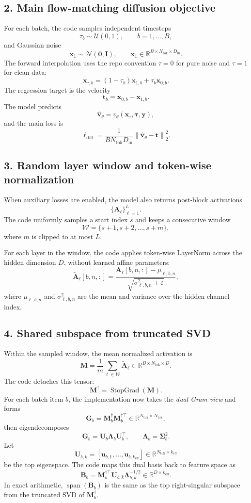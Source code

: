 \documentclass[11pt]{article}
\newcommand{\StopGrad}{\operatorname{StopGrad}}
\begin{document}
\subsection*{2. Main flow-matching diffusion objective}
For each batch, the code samples independent timesteps
\[
  \tau_b \sim \mathcal{U}(0,1),
  \qquad b=1,\dots,B,
\]
and Gaussian noise
\[
  \bm{x}_1 \sim \mathcal{N}(\bm{0}, \bm{I}),
  \qquad
  \bm{x}_1 \in \mathbb{R}^{B\times N_{\mathrm{tok}}\times D_{\mathrm{in}}}.
\]
The forward interpolation uses the repo convention $\tau=0$ for pure noise and $\tau=1$ for clean data:
\[
  \bm{x}_{\tau,b} = (1-\tau_b)\bm{x}_{1,b} + \tau_b \bm{x}_{0,b}.
\]
The regression target is the velocity
\[
  \bm{t}_b = \bm{x}_{0,b} - \bm{x}_{1,b}.
\]
The model predicts
\[
  \hat{\bm{v}}_\theta = v_\theta(\bm{x}_\tau,\bm{\tau},\bm{y}),
\]
and the main loss is
\[
  \ell_{\mathrm{diff}}
  =
  \frac{1}{B N_{\mathrm{tok}} D_{\mathrm{in}}}
  \left\|
    \hat{\bm{v}}_\theta - \bm{t}
  \right\|_2^2.
\]

\subsection*{3. Random layer window and token-wise normalization}
When auxiliary losses are enabled, the model also returns post-block activations
\[
  \{\bm{A}_\ell\}_{\ell=1}^{L}.
\]
The code uniformly samples a start index $s$ and keeps a consecutive window
\[
  \mathcal{W} = \{s+1, s+2, \dots, s+m\},
\]
where $m$ is clipped to at most $L$.

For each layer in the window, the code applies token-wise LayerNorm across the hidden dimension $D$, without learned affine parameters:
\[
  \tilde{\bm{A}}_\ell[b,n,:]
  =
  \frac{
    \bm{A}_\ell[b,n,:] - \mu_{\ell,b,n}
  }{
    \sqrt{\sigma_{\ell,b,n}^2 + \varepsilon}
  },
\]
where $\mu_{\ell,b,n}$ and $\sigma_{\ell,b,n}^2$ are the mean and variance over the hidden channel index.

\subsection*{4. Shared subspace from truncated SVD}
Within the sampled window, the mean normalized activation is
\[
  \bm{M}
  =
  \frac{1}{m}\sum_{\ell\in\mathcal{W}}\tilde{\bm{A}}_\ell
  \in \mathbb{R}^{B\times N_{\mathrm{tok}}\times D}.
\]
The code detaches this tensor:
\[
  \bm{M}^{\dagger} = \StopGrad(\bm{M}).
\]
For each batch item $b$, the implementation now takes the \emph{dual Gram view} and forms
\[
  \bm{G}_b
  =
  \bm{M}^{\dagger}_b \bm{M}^{\dagger\top}_b
  \in \mathbb{R}^{N_{\mathrm{tok}}\times N_{\mathrm{tok}}},
\]
then eigendecomposes
\[
  \bm{G}_b
  =
  \bm{U}_b \bm{\Lambda}_b \bm{U}_b^\top,
  \qquad
  \bm{\Lambda}_b = \bm{\Sigma}_b^2.
\]
Let
\[
  \bm{U}_{b,k}
  =
  \left[\bm{u}_{b,1}, \dots, \bm{u}_{b,k_{\mathrm{eff}}}\right]
  \in \mathbb{R}^{N_{\mathrm{tok}}\times k_{\mathrm{eff}}}
\]
be the top eigenspace. The code maps this dual basis back to feature space as
\[
  \bm{B}_b
  =
  \bm{M}_b^{\dagger\top}\bm{U}_{b,k}\bm{\Lambda}_{b,k}^{-1/2}
  \in \mathbb{R}^{D\times k_{\mathrm{eff}}}.
\]
In exact arithmetic, $\operatorname{span}(\bm{B}_b)$ is the same as the top right-singular
subspace from the truncated SVD of $\bm{M}^{\dagger}_b$.
\end{document}
